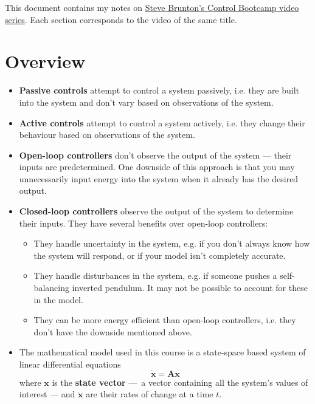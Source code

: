 \documentclass{article}
\renewcommand{\vec}[1]{\boldsymbol{\mathbf{#1}}}
\newcommand{\dvec}[1]{\dot{\vec{#1}}}
\begin{document}
This document contains my notes on \href{https://www.youtube.com/playlist?list=PLMrJAkhIeNNR20Mz-VpzgfQs5zrYi085m}{Steve Brunton's Control Bootcamp video series}. Each section corresponds to the video of the same title.

\tableofcontents

\section{Overview}

\begin{itemize}
  \item \textbf{Passive controls} attempt to control a system passively, i.e. they are built into the system and don't vary based on observations of the system.

  \item \textbf{Active controls} attempt to control a system actively, i.e. they change their behaviour based on observations of the system.

  \item \textbf{Open-loop controllers} don't observe the output of the system — their inputs are predetermined. One downside of this approach is that you may unnecessarily input energy into the system when it already has the desired output.

  \item \textbf{Closed-loop controllers} observe the output of the system to determine their inputs. They have several benefits over open-loop controllers:

        \begin{itemize}
          \item They handle uncertainty in the system, e.g. if you don't always know how the system will respond, or if your model isn't completely accurate.

          \item They handle disturbances in the system, e.g. if someone pushes a self-balancing inverted pendulum. It may not be possible to account for these in the model.

          \item They can be more energy efficient than open-loop controllers, i.e. they don't have the downside mentioned above.
        \end{itemize}

  \item The mathematical model used in this course is a state-space based system of linear differential equations \[\dvec{x} = \vec{A} \vec{x}\] where $\vec{x}$ is the \textbf{state vector} — a vector containing all the system's values of interest — and $\dvec{x}$ are their rates of change at a time $t$.


\end{itemize}
\end{document}
